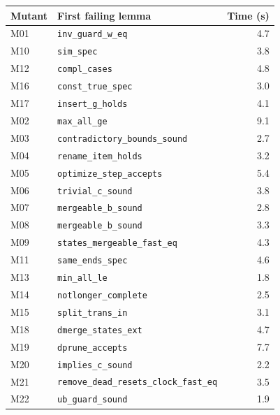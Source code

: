 \begin{tabular}{@{}llr@{}}
\toprule
Mutant & First failing lemma & Time (s) \\
\midrule
M01 & \texttt{inv\_guard\_w\_eq} & 4.7 \\
M10 & \texttt{sim\_spec} & 3.8 \\
M12 & \texttt{compl\_cases} & 4.8 \\
M16 & \texttt{const\_true\_spec} & 3.0 \\
M17 & \texttt{insert\_g\_holds} & 4.1 \\
\midrule
M02 & \texttt{max\_all\_ge} & 9.1 \\
M03 & \texttt{contradictory\_bounds\_sound} & 2.7 \\
M04 & \texttt{rename\_item\_holds} & 3.2 \\
M05 & \texttt{optimize\_step\_accepts} & 5.4 \\
M06 & \texttt{trivial\_c\_sound} & 3.8 \\
M07 & \texttt{mergeable\_b\_sound} & 2.8 \\
M08 & \texttt{mergeable\_b\_sound} & 3.3 \\
M09 & \texttt{states\_mergeable\_fast\_eq} & 4.3 \\
M11 & \texttt{same\_ends\_spec} & 4.6 \\
M13 & \texttt{min\_all\_le} & 1.8 \\
M14 & \texttt{notlonger\_complete} & 2.5 \\
M15 & \texttt{split\_trans\_in} & 3.1 \\
M18 & \texttt{dmerge\_states\_ext} & 4.7 \\
M19 & \texttt{dprune\_accepts} & 7.7 \\
M20 & \texttt{implies\_c\_sound} & 2.2 \\
M21 & \texttt{remove\_dead\_resets\_clock\_fast\_eq} & 3.5 \\
M22 & \texttt{ub\_guard\_sound} & 1.9 \\
\bottomrule
\end{tabular}
